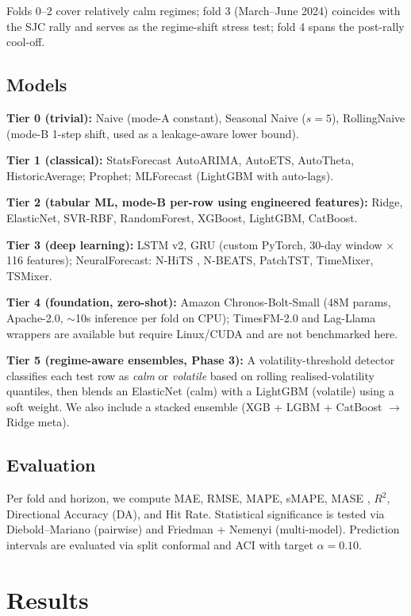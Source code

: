 \documentclass[conference]{IEEEtran}
\begin{document}
Folds 0--2 cover relatively calm regimes; fold 3 (March--June 2024) coincides with the SJC rally and serves as the regime-shift stress test; fold 4 spans the post-rally cool-off.

\subsection{Models}

\textbf{Tier 0 (trivial):} Naive (mode-A constant), Seasonal Naive ($s=5$), RollingNaive (mode-B 1-step shift, used as a leakage-aware lower bound).

\textbf{Tier 1 (classical):} StatsForecast AutoARIMA, AutoETS, AutoTheta, HistoricAverage; Prophet; MLForecast (LightGBM with auto-lags).

\textbf{Tier 2 (tabular ML, mode-B per-row using engineered features):} Ridge, ElasticNet, SVR-RBF, RandomForest, XGBoost, LightGBM, CatBoost.

\textbf{Tier 3 (deep learning):} LSTM v2, GRU (custom PyTorch, 30-day window $\times$ 116 features); NeuralForecast: N-HiTS \cite{challu2023nhits}, N-BEATS, PatchTST, TimeMixer, TSMixer.

\textbf{Tier 4 (foundation, zero-shot):} Amazon Chronos-Bolt-Small (48M params, Apache-2.0, $\sim$10s inference per fold on CPU); TimesFM-2.0 and Lag-Llama wrappers are available but require Linux/CUDA and are not benchmarked here.

\textbf{Tier 5 (regime-aware ensembles, Phase 3):} A volatility-threshold detector classifies each test row as \emph{calm} or \emph{volatile} based on rolling realised-volatility quantiles, then blends an ElasticNet (calm) with a LightGBM (volatile) using a soft weight. We also include a stacked ensemble (XGB + LGBM + CatBoost $\rightarrow$ Ridge meta).

\subsection{Evaluation}
Per fold and horizon, we compute MAE, RMSE, MAPE, sMAPE, MASE \cite{hyndman2021}, $R^2$, Directional Accuracy (DA), and Hit Rate. Statistical significance is tested via Diebold--Mariano \cite{diebold1995} (pairwise) and Friedman + Nemenyi \cite{demsar2006} (multi-model). Prediction intervals are evaluated via split conformal and ACI \cite{gibbs2021aci} with target $\alpha = 0.10$.

\section{Results}
\end{document}
